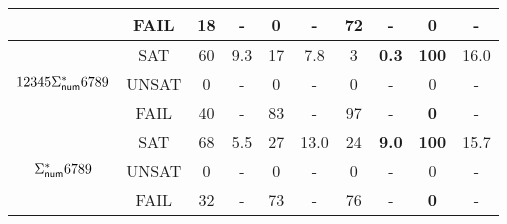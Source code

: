 \begin{table*}[ht]
\begin{tabular}{|c|c|c|c|c|c|c|c|c|c|}
        & FAIL & 18 & - & {\bf 0} & - & 72 & - & {\bf 0} & - \\ \hline
        \cline{1-10}
       \multirow{3}{*}{$12345\Sigma^*_{\sf num}6789$} & SAT & 60 & 9.3 & 17 & 7.8 & 3 & {\bf 0.3} & {\bf 100} & 16.0 \\
        \cline{2-10}
        & UNSAT & 0 & - & 0 & - & 0 & - & 0 & - \\
         \cline{2-10}
        & FAIL & 40 & - & 83 & - & 97 & - & {\bf 0} & - \\ \hline
        \cline{1-10}
       \multirow{3}{*}{$\Sigma^*_{\sf num}6789$} & SAT & 68 & 5.5 & 27 & 13.0 & 24 & {\bf 9.0} & {\bf 100} & 15.7 \\
        \cline{2-10}
        & UNSAT & 0 & - & 0 & - & 0 & - & 0 & - \\
         \cline{2-10}
        & FAIL & 32 & - & 73 & - & 76 & - & {\bf 0} &- \\
        \hline
       \end{tabular}
           \label{table:string}
\end{table*}